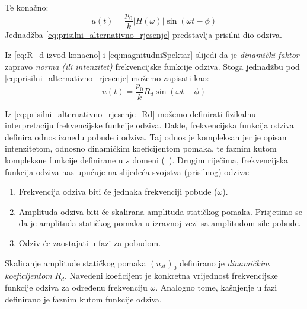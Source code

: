 Te konačno:
\begin{equation}\label{eq:prisilni_alternativno_rjesenje}
    u(t)=\frac{p_0}{k}|H(\omega)|\sin(\omega t - \phi)
\end{equation}
Jednadžba \eqref{eq:prisilni_alternativno_rjesenje} predstavlja prisilni dio odziva.

Iz \eqref{eq:R_d-izvod-konacno} i \eqref{eq:magnitudniSpektar} slijedi da je
\textit{dinamički faktor} zapravo \textit{norma (ili intenzitet)} frekvencijske 
funkcije odziva.  Stoga jednadžbu pod \eqref{eq:prisilni_alternativno_rjesenje} 
možemo zapisati kao:
\begin{equation}\label{eq:prisilni_alternativno_rjesenje_Rd}
    u(t)=\frac{p_0}{k}R_d\sin(\omega t - \phi)
\end{equation}

Iz \eqref{eq:prisilni_alternativno_rjesenje_Rd} možemo definirati fizikalnu 
interpretaciju frekvencijske funkcije odziva.  Dakle, frekvencijska funkcija 
odziva definira odnos između pobude i odziva. Taj odnos je kompleksan jer je 
opisan intenzitetom, odnosno dinamičkim koeficijentom pomaka, te faznim kutom 
kompleksne funkcije definirane u $s$ domeni (~\cite{koscakturkalj}).  Drugim riječima, 
frekvencijska funkcija odziva nas upućuje na slijedeća svojstva (prisilnog) odziva:
\begin{enumerate}
    \item Frekvencija odziva biti će jednaka frekvenciji pobude ($\omega$).
    \item Amplituda odziva biti će skalirana amplituda statičkog pomaka. Prisjetimo
        se da je amplituda statičkog pomaka u izravnoj vezi sa amplitudom sile pobude.
    \item Odziv će zaostajati u fazi za pobudom. 
\end{enumerate}

Skaliranje amplitude statičkog pomaka $(u_{st})_0$ definirano je \textit{dinamičkim
koeficijentom} $R_d$. Navedeni koeficijent je konkretna vrijednost frekvencijske funkcije
odziva za određenu frekvenciju $\omega$. Analogno tome, kašnjenje u fazi definirano je 
faznim kutom funkcije odziva.

